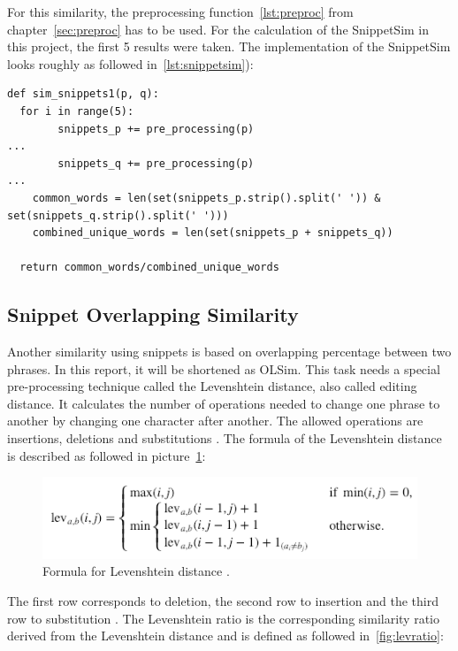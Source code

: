 \documentclass[conference]{IEEEtran}
\begin{document}
For this similarity, the preprocessing function~\ref{lst:preproc} from chapter~\ref{sec:preproc} has to be used. For the calculation of the SnippetSim in this project, the first 5 results were taken. The implementation of the SnippetSim looks roughly as followed in~\ref{lst:snippetsim}):

\begin{lstlisting}[frame=single, label=lst:snippetsim, caption={Calculation of SnippetSim}, captionpos=b]
def sim_snippets1(p, q):
  for i in range(5):
        snippets_p += pre_processing(p)    
... 
        snippets_q += pre_processing(p)
...    
    common_words = len(set(snippets_p.strip().split(' ')) & set(snippets_q.strip().split(' '))) 
    combined_unique_words = len(set(snippets_p + snippets_q))
    
  return common_words/combined_unique_words
\end{lstlisting}

\subsection{Snippet Overlapping Similarity}\label{subsec:olsim}

Another similarity using snippets is based on overlapping percentage between two phrases. In this report, it will be shortened as OLSim. This task needs a special pre-processing technique called the Levenshtein distance, also called editing distance. It calculates the number of operations needed to change one phrase to another by changing one character after another. The allowed operations are insertions, deletions and substitutions \cite{navarro}. The formula of the Levenshtein distance is described as followed in picture~\ref{fig:lev}:

\begin{figure}[h]
\centerline{\includegraphics[scale=0.6]{img/lev.png}}
\caption{Formula for Levenshtein distance \cite{fuzzy}.}
\label{fig:lev}
\end{figure}

The first row corresponds to deletion, the second row to insertion and the third row to substitution \cite{fuzzy}. The Levenshtein ratio is the corresponding similarity ratio derived from the Levenshtein distance \cite{fuzzy} and is defined as followed in~\ref{fig:levratio}:
\end{document}

